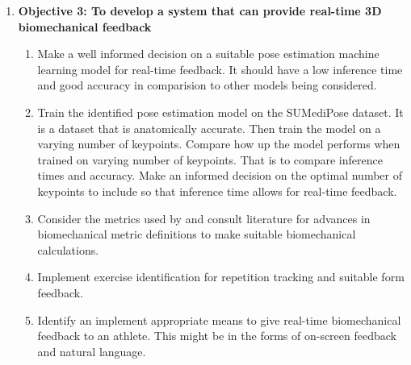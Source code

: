\begin{enumerate}
    \item \textbf{Objective 3: To develop a system that can provide real-time 3D biomechanical feedback}
        \begin{enumerate}
            \item Make a well informed decision on a suitable pose estimation machine learning model for real-time feedback. It should have a low inference time and good accuracy in comparision to other models being considered. 
            \item Train the identified pose estimation model on the SUMediPose dataset. It is a dataset that is anatomically accurate. Then train the model on a varying number of keypoints. Compare how  up the model performs when trained on varying number of keypoints. That is to compare inference times and accuracy. Make an informed decision on the optimal number of keypoints to include so that inference time allows for real-time feedback.
            \item Consider the metrics used by \citet{steyn2024markerless} and consult literature for advances in biomechanical metric definitions to make suitable biomechanical calculations.
            \item Implement exercise identification for repetition tracking and suitable form feedback.
            \item Identify an implement appropriate means to give real-time biomechanical feedback to an athlete. This might be in the forms of on-screen feedback and natural language.
        \end{enumerate}
        

\end{enumerate}
